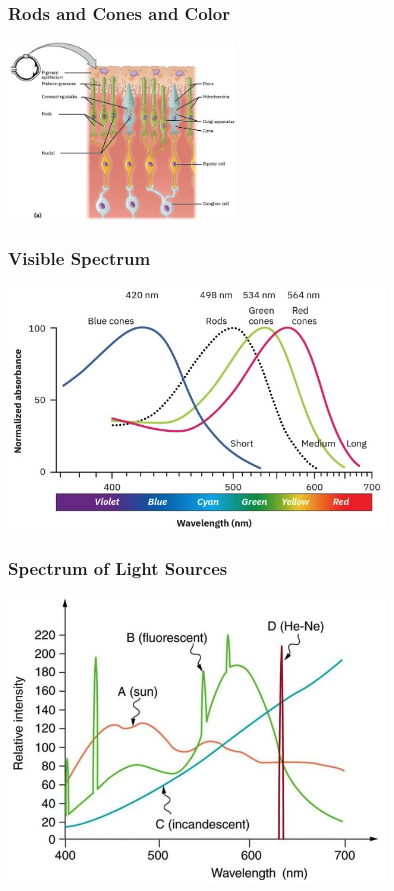 \documentclass{beamer}
\begin{document}
\begin{frame}\frametitle{Rods and Cones and Color}

\begin{center}
\includegraphics[width=6cm]{fig/rodscones.jpg}
\end{center}

\end{frame}

\begin{frame}\frametitle{Visible Spectrum}

\begin{center}
\includegraphics[width=10cm]{fig/visSpec.jpg}
\end{center}

\end{frame}

\begin{frame}\frametitle{Spectrum of Light Sources}

\begin{center}
\includegraphics[width=10cm]{fig/lightSpec.jpg}
\end{center}

\end{frame}
\end{document}
